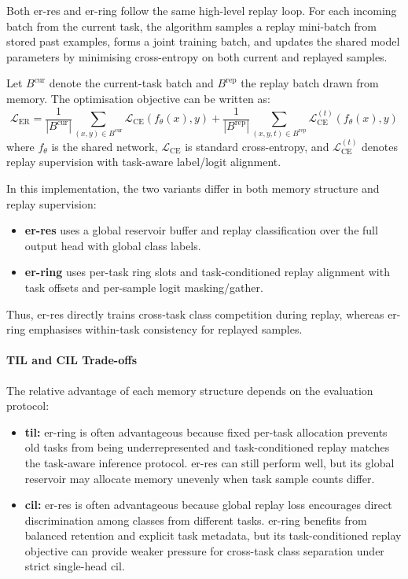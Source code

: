 Both \gls{er-res} and \gls{er-ring} follow the same high-level replay loop. For each incoming batch from the current task, the algorithm samples a replay mini-batch from stored past examples, forms a joint training batch, and updates the shared model parameters by minimising cross-entropy on both current and replayed samples.

Let $B^\text{cur}$ denote the current-task batch and $B^\text{rep}$ the replay batch drawn from memory. The optimisation objective can be written as:
%
\begin{equation}\label{eqn:er_generic_loss}
    \mathcal{L}_\text{ER}
    = \frac{1}{|B^\text{cur}|}\sum_{(x,y)\in B^\text{cur}}
      \mathcal{L}_\text{CE}\!\left(f_\theta(x), y\right)
    + \frac{1}{|B^\text{rep}|}\sum_{(x,y,t)\in B^\text{rep}}
      \mathcal{L}_\text{CE}^{(t)}\!\left(f_\theta(x), y\right)
\end{equation}
%
where $f_\theta$ is the shared network, $\mathcal{L}_\text{CE}$ is standard cross-entropy, and $\mathcal{L}_\text{CE}^{(t)}$ denotes replay supervision with task-aware label/logit alignment.

In this implementation, the two variants differ in both memory structure and replay supervision:
\begin{itemize}
    \item \textbf{\gls{er-res}} uses a global reservoir buffer and replay classification over the full output head with global class labels.
    \item \textbf{\gls{er-ring}} uses per-task ring slots and task-conditioned replay alignment with task offsets and per-sample logit masking/gather.
\end{itemize}
Thus, \gls{er-res} directly trains cross-task class competition during replay, whereas \gls{er-ring} emphasises within-task consistency for replayed samples.

\paragraph{TIL and CIL Trade-offs}

The relative advantage of each memory structure depends on the evaluation protocol:
\begin{itemize}
    \item \textbf{\gls{til}:} \gls{er-ring} is often advantageous because fixed per-task allocation prevents old tasks from being underrepresented and task-conditioned replay matches the task-aware inference protocol. \gls{er-res} can still perform well, but its global reservoir may allocate memory unevenly when task sample counts differ.
    \item \textbf{\gls{cil}:} \gls{er-res} is often advantageous because global replay loss encourages direct discrimination among classes from different tasks. \gls{er-ring} benefits from balanced retention and explicit task metadata, but its task-conditioned replay objective can provide weaker pressure for cross-task class separation under strict single-head \gls{cil}.
\end{itemize}

